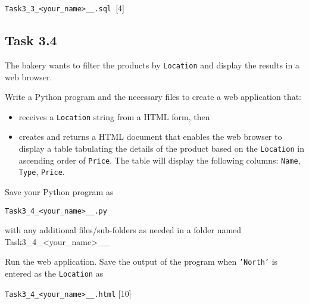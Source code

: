 \texttt{Task3\_3\_<your\_name>\_<centre number>\_<index number>.sql
}\hfill{}{[}4{]}

\subsection*{Task 3.4 }

The bakery wants to filter the products by \texttt{Location} and display
the results in a web browser. 

Write a Python program and the necessary files to create a web application
that: 
\begin{itemize}
\item receives a \texttt{Location} string from a HTML form, then 
\item creates and returns a HTML document that enables the web browser to
display a table tabulating the details of the product based on the
\texttt{Location} in ascending order of \texttt{Price}. The table
will display the following columns: \texttt{Name}, \texttt{Type},
\texttt{Price}.
\end{itemize}
Save your Python program as 

\texttt{Task3\_4\_<your\_name>\_<centre number>\_<index number>.py }

with any additional files/sub-folders as needed in a folder named
Task3\_4\_<your\_name>\_<centre number>\_<index number>

Run the web application. Save the output of the program when \texttt{'North'}
is entered as the \texttt{Location} as 

\texttt{Task3\_4\_<your\_name>\_<centre number>\_<index number>.html}
\hfill{}{[}10{]}